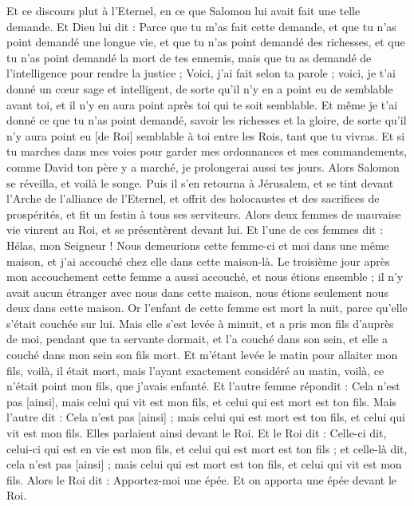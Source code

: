 \begin{multicols}{2}
Et ce discours plut à l'Eternel, en ce que Salomon lui avait fait une telle demande.
Et Dieu lui dit : Parce que tu m'as fait cette demande, et que tu n'as point demandé une longue vie, et que tu n'as point demandé des richesses, et que tu n'as point demandé la mort de tes ennemis, mais que tu as demandé de l'intelligence pour rendre la justice ;
Voici, j'ai fait selon ta parole ; voici, je t'ai donné un cœur sage et intelligent, de sorte qu'il n'y en a point eu de semblable avant toi, et il n'y en aura point après toi qui te soit semblable.
Et même je t'ai donné ce que tu n'as point demandé, savoir les richesses et la gloire, de sorte qu'il n'y aura point eu [de Roi] semblable à toi entre les Rois, tant que tu vivras.
Et si tu marches dans mes voies pour garder mes ordonnances et mes commandements, comme David ton père y a marché, je prolongerai aussi tes jours.
Alors Salomon se réveilla, et voilà le songe. Puis il s'en retourna à Jérusalem, et se tint devant l'Arche de l'alliance de l'Eternel, et offrit des holocaustes et des sacrifices de prospérités, et fit un festin à tous ses serviteurs.
Alors deux femmes de mauvaise vie vinrent au Roi, et se présentèrent devant lui.
Et l'une de ces femmes dit : Hélas, mon Seigneur ! Nous demeurions cette femme-ci et moi dans une même maison, et j'ai accouché chez elle dans cette maison-là.
Le troisième jour après mon accouchement cette femme a aussi accouché, et nous étions ensemble ; il n'y avait aucun étranger avec nous dans cette maison, nous étions seulement nous deux dans cette maison.
Or l'enfant de cette femme est mort la nuit, parce qu'elle s'était couchée sur lui.
Mais elle s'est levée à minuit, et a pris mon fils d'auprès de moi, pendant que ta servante dormait, et l'a couché dans son sein, et elle a couché dans mon sein son fils mort.
Et m'étant levée le matin pour allaiter mon fils, voilà, il était mort, mais l'ayant exactement considéré au matin, voilà, ce n'était point mon fils, que j'avais enfanté.
Et l'autre femme répondit : Cela n'est pas [ainsi], mais celui qui vit est mon fils, et celui qui est mort est ton fils. Mais l'autre dit : Cela n'est pas [ainsi] ; mais celui qui est mort est ton fils, et celui qui vit est mon fils. Elles parlaient ainsi devant le Roi.
Et le Roi dit : Celle-ci dit, celui-ci qui est en vie est mon fils, et celui qui est mort est ton fils ; et celle-là dit, cela n'est pas [ainsi] ; mais celui qui est mort est ton fils, et celui qui vit est mon fils.
Alors le Roi dit : Apportez-moi une épée. Et on apporta une épée devant le Roi.

\end{multicols}
